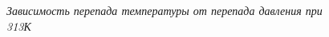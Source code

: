\documentclass[a4paper, fontsize = 14pt]{article}
\begin{document}
\begin{figure}[hbt]
\caption{\textit{Зависимость перепада температуры от перепада давления при 313К}}
\end{figure}
\end{document}
